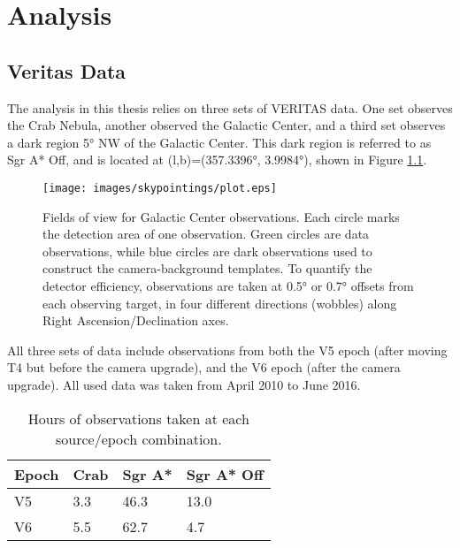 \cleartooddpage[\thispagestyle{empty}]
\chapter{Analysis}\label{chapter:analysis}

\section{Veritas Data}\label{veritasdata}
  The analysis in this thesis relies on three sets of VERITAS data.
  One set observes the Crab Nebula, another observed the Galactic Center, and a third set observes a dark region \nicetilde\ang{5} NW of the Galactic Center.
  This dark region is referred to as  Sgr A* Off, and is located at (l,b)=(\ang{357.3396}, \ang{3.9984}), shown in Figure \ref{fig:gcfieldsofview}.

  \begin{figure}[ht]
    \centering
    \texttt{[image: images/skypointings/plot.eps]}
    \caption[VERITAS Galactic Center Pointings]{
      Fields of view for Galactic Center observations.
      Each circle marks the detection area of one observation.
      Green circles are data observations, while blue circles are dark observations used to construct the camera-background templates.
      To quantify the detector efficiency, observations are taken at \ang{0.5} or \ang{0.7} offsets from each observing target, in four different directions (wobbles) along Right Ascension/Declination axes.
    }
    \label{fig:gcfieldsofview}
  \end{figure}


  All three sets of data include observations from both the V5 epoch (after moving T4 but before the camera upgrade), and the V6 epoch (after the camera upgrade).
  All used data was taken from April 2010 to June 2016.

  \begin{table}[]
    \centering
    \caption{Hours of observations taken at each source/epoch combination.}
    \label{tab:observation_times}
    \begin{tabular}{|l|l|l|l|}
      \hline
      \textbf{Epoch} & \textbf{Crab} & \textbf{Sgr A*} & \textbf{Sgr A* Off} \\ \hline
      V5             & 3.3           & 46.3            & 13.0                \\ \hline
      V6             & 5.5           & 62.7            & 4.7                 \\ \hline
    \end{tabular}
  \end{table}


